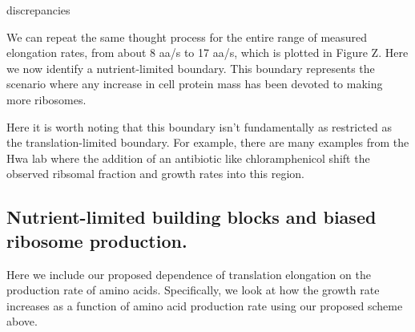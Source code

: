 discrepancies \documentclass[11pt, letterpaper]{article}
\begin{document}
We can repeat the same thought process for the entire range of measured
elongation rates, from about 8 aa/s to 17 aa/s, which is plotted in Figure Z.
Here we now identify a nutrient-limited boundary. This boundary represents the
scenario where any increase in cell protein mass has been devoted to making more
ribosomes.

Here it is worth noting that this boundary isn't fundamentally as restricted as the
translation-limited boundary. For example, there are many examples from the Hwa
lab where the addition of an antibiotic like chloramphenicol shift the observed
ribsomal fraction and growth rates into this region.



\subsection{Nutrient-limited building blocks and biased ribosome production.}

Here we include our proposed dependence of translation elongation on the production rate of
amino acids. Specifically, we look at how the growth rate increases as a function of
amino acid production rate using our proposed scheme above.





\end{document}
